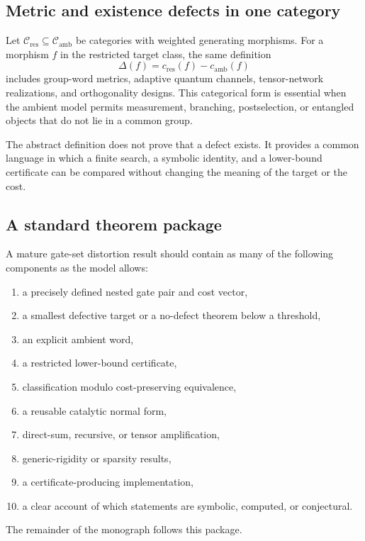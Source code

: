 \subsection{Metric and existence defects in one category}
Let $\mathcal C_{\mathrm{res}}\subseteq\mathcal C_{\mathrm{amb}}$ be categories with weighted generating morphisms.  For a morphism $f$ in the restricted target class, the same definition
\[
\Delta(f)=c_{\mathrm{res}}(f)-c_{\mathrm{amb}}(f)
\]
includes group-word metrics, adaptive quantum channels, tensor-network realizations, and orthogonality designs.  This categorical form is essential when the ambient model permits measurement, branching, postselection, or entangled objects that do not lie in a common group.

\begin{boundarybox}
The abstract definition does not prove that a defect exists.  It provides a common language in which a finite search, a symbolic identity, and a lower-bound certificate can be compared without changing the meaning of the target or the cost.
\end{boundarybox}

\subsection{A standard theorem package}
A mature gate-set distortion result should contain as many of the following components as the model allows:
\begin{enumerate}
\item a precisely defined nested gate pair and cost vector,
\item a smallest defective target or a no-defect theorem below a threshold,
\item an explicit ambient word,
\item a restricted lower-bound certificate,
\item classification modulo cost-preserving equivalence,
\item a reusable catalytic normal form,
\item direct-sum, recursive, or tensor amplification,
\item generic-rigidity or sparsity results,
\item a certificate-producing implementation,
\item a clear account of which statements are symbolic, computed, or conjectural.
\end{enumerate}
The remainder of the monograph follows this package.

